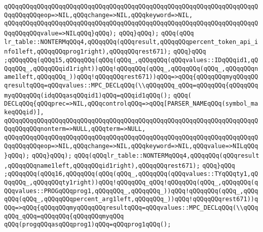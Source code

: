 \verb|qQQqqQQqqQQqqQQqqQQqqQQqqQQqqQQqqQQqqQQqqQQqqQQqqQQqqQQqqQQqqQQqqQQqqQQqqQQqqQQqeop=>NIL,qQQqchange=>NIL,qQQqkeyword=>NIL,|\newline
\verb|qQQqqQQqqQQqqQQqqQQqqQQqqQQqqQQqqQQqqQQqqQQqqQQqqQQqqQQqqQQqqQQqqQQqqQQqqQQqqQQqvalue=>NILqQQq}qQQq);|\newline
\verb|qQQq}qQQq);|\newline
\verb|qQQq(qQQq|\newline
\verb|lr_table::NONTERMqQQq4,qQQqqQQq(qQQqresult,qQQqqQQqpercent_token_api_info1left,qQQqqQQqprog1right),qQQqqQQqrest671);|\newline
\verb|qQQq}qQQq|\newline
\verb|;qQQqqQQq(qQQq15,qQQqqQQq(qQQq(qQQq_,qQQqqQQq(qQQqvalues::IDqQQqid1,qQQqqQQq_,qQQqqQQqid1right))qQQq!qQQqqQQq(qQQq_,qQQqqQQq(qQQq_,qQQqqQQqname1left,qQQqqQQq_))qQQq!qQQqqQQqrest671))qQQq=>qQQq{qQQqqQQqmyqQQqqQQqresultqQQq=qQQqvalues::MPC_DECLqQQq(\\qQQqqQQq_qQQq=qQQqqQQq{qQQqqQQqmyqQQqqQQq(idqQQqasqQQqid1)qQQq=qQQqid1qQQq();|\newline
\verb|qQQq(|\newline
\verb|DECLqQQq{qQQqprec=>NIL,qQQqcontrolqQQq=>qQQq[PARSER_NAMEqQQq(symbol_makeqQQqid)],|\newline
\verb|qQQqqQQqqQQqqQQqqQQqqQQqqQQqqQQqqQQqqQQqqQQqqQQqqQQqqQQqqQQqqQQqqQQqqQQqqQQqqQQqnonterm=>NULL,qQQqterm=>NULL,|\newline
\verb|qQQqqQQqqQQqqQQqqQQqqQQqqQQqqQQqqQQqqQQqqQQqqQQqqQQqqQQqqQQqqQQqqQQqqQQqqQQqqQQqeop=>NIL,qQQqchange=>NIL,qQQqkeyword=>NIL,qQQqvalue=>NILqQQq}qQQq);|\newline
\verb|qQQq}qQQq);|\newline
\verb|qQQq(qQQqlr_table::NONTERMqQQq4,qQQqqQQq(qQQqresult|\newline
\verb|,qQQqqQQqname1left,qQQqqQQqid1right),qQQqqQQqrest671);|\newline
\verb|qQQq}qQQq|\newline
\verb|;qQQqqQQq(qQQq16,qQQqqQQq(qQQq(qQQq_,qQQqqQQq(qQQqvalues::TYqQQqty1,qQQqqQQq_,qQQqqQQqty1right))qQQq!qQQqqQQq_qQQq!qQQqqQQq(qQQq_,qQQqqQQq(qQQqvalues::PROGqQQqprog1,qQQqqQQq_,qQQqqQQq_))qQQq!qQQqqQQq(qQQq_,qQQqqQQq(qQQq_,qQQqqQQqpercent_arg1left,qQQqqQQq_))qQQq!qQQqqQQqrest671))qQQq=>qQQq{qQQqqQQqmyqQQqqQQqresultqQQq=qQQqvalues::MPC_DECLqQQq(\\qQQqqQQq_qQQq=qQQqqQQq{qQQqqQQqmyqQQq|\newline
\verb|qQQq(progqQQqasqQQqprog1)qQQq=qQQqprog1qQQq();|\newline
